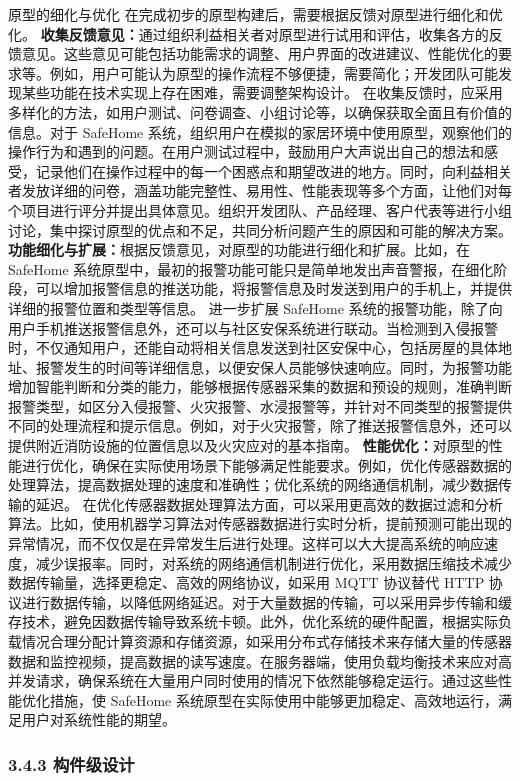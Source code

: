 原型的细化与优化 在完成初步的原型构建后，需要根据反馈对原型进行细化和优化。
\textbf{收集反馈意见：}通过组织利益相关者对原型进行试用和评估，收集各方的反馈意见。这些意见可能包括功能需求的调整、用户界面的改进建议、性能优化的要求等。例如，用户可能认为原型的操作流程不够便捷，需要简化；开发团队可能发现某些功能在技术实现上存在困难，需要调整架构设计。
在收集反馈时，应采用多样化的方法，如用户测试、问卷调查、小组讨论等，以确保获取全面且有价值的信息。对于 SafeHome
系统，组织用户在模拟的家居环境中使用原型，观察他们的操作行为和遇到的问题。在用户测试过程中，鼓励用户大声说出自己的想法和感受，记录他们在操作过程中的每一个困惑点和期望改进的地方。同时，向利益相关者发放详细的问卷，涵盖功能完整性、易用性、性能表现等多个方面，让他们对每个项目进行评分并提出具体意见。组织开发团队、产品经理、客户代表等进行小组讨论，集中探讨原型的优点和不足，共同分析问题产生的原因和可能的解决方案。
\textbf{功能细化与扩展：}根据反馈意见，对原型的功能进行细化和扩展。比如，在 SafeHome
系统原型中，最初的报警功能可能只是简单地发出声音警报，在细化阶段，可以增加报警信息的推送功能，将报警信息及时发送到用户的手机上，并提供详细的报警位置和类型等信息。 进一步扩展 SafeHome
系统的报警功能，除了向用户手机推送报警信息外，还可以与社区安保系统进行联动。当检测到入侵报警时，不仅通知用户，还能自动将相关信息发送到社区安保中心，包括房屋的具体地址、报警发生的时间等详细信息，以便安保人员能够快速响应。同时，为报警功能增加智能判断和分类的能力，能够根据传感器采集的数据和预设的规则，准确判断报警类型，如区分入侵报警、火灾报警、水浸报警等，并针对不同类型的报警提供不同的处理流程和提示信息。例如，对于火灾报警，除了推送报警信息外，还可以提供附近消防设施的位置信息以及火灾应对的基本指南。
\textbf{性能优化：}对原型的性能进行优化，确保在实际使用场景下能够满足性能要求。例如，优化传感器数据的处理算法，提高数据处理的速度和准确性；优化系统的网络通信机制，减少数据传输的延迟。
在优化传感器数据处理算法方面，可以采用更高效的数据过滤和分析算法。比如，使用机器学习算法对传感器数据进行实时分析，提前预测可能出现的异常情况，而不仅仅是在异常发生后进行处理。这样可以大大提高系统的响应速度，减少误报率。同时，对系统的网络通信机制进行优化，采用数据压缩技术减少数据传输量，选择更稳定、高效的网络协议，如采用
MQTT 协议替代 HTTP
协议进行数据传输，以降低网络延迟。对于大量数据的传输，可以采用异步传输和缓存技术，避免因数据传输导致系统卡顿。此外，优化系统的硬件配置，根据实际负载情况合理分配计算资源和存储资源，如采用分布式存储技术来存储大量的传感器数据和监控视频，提高数据的读写速度。在服务器端，使用负载均衡技术来应对高并发请求，确保系统在大量用户同时使用的情况下依然能够稳定运行。通过这些性能优化措施，使
SafeHome 系统原型在实际使用中能够更加稳定、高效地运行，满足用户对系统性能的期望。 \subsubsection{3.4.3 构件级设计}\label{ux6784ux4ef6ux7ea7ux8bbeux8ba1}
